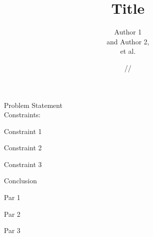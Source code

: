 \documentclass[11pt]{report}
\title{\textbf{Title}}
\author{Author 1\\and Author 2,\\et al.}
\date{\oldstylenums{00}/\oldstylenums{00}/\oldstylenums{00}}
\begin{document}
\maketitle
 
\begin{outline}
	\item Problem Statement \\ Constraints:
    \begin{outline}
    	\item Constraint 1
    	\item Constraint 2
    	\item Constraint 3

	\end{outline}
\end{outline}

\newpage

Conclusion
\par Par 1
\par Par 2
\par Par 3
\end{document}
